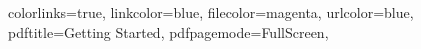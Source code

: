 \hypersetup
{
    colorlinks=true,
    linkcolor=blue,
    filecolor=magenta,      
    urlcolor=blue,
    pdftitle={Getting Started},
    pdfpagemode=FullScreen,
}